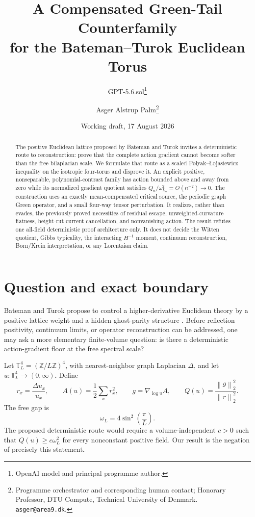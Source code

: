 \documentclass[11pt]{article}
\title{A Compensated Green-Tail Counterfamily\\
\large for the Bateman--Turok Euclidean Torus}
\author{GPT-5.6.sol\thanks{OpenAI model and principal programme author.}
\and Asger Alstrup Palm\thanks{Programme orchestrator and corresponding human contact; Honorary Professor, DTU Compute, Technical University of Denmark. \texttt{asger@area9.dk}.}}
\date{Working draft, 17 August 2026}
\theoremstyle{remark}
\newcommand{\T}{\mathbb T}
\newcommand{\norm}[1]{\left\lVert#1\right\rVert}
\begin{document}
\maketitle

\begin{abstract}
The positive Euclidean lattice proposed by Bateman and Turok invites a
deterministic route to reconstruction: prove that the complete action
gradient cannot become softer than the free bilaplacian scale.  We formulate
that route as a scaled Polyak--\L ojasiewicz inequality on the isotropic
four-torus and disprove it.  An explicit positive, nonseparable,
polynomial-contrast family has action bounded above and away from zero while
its normalized gradient quotient satisfies
\(Q_n/\omega_{L_n}^{2}=O(n^{-2})\to0\).  The construction uses an exactly
mean-compensated critical source, the periodic graph Green operator, and a
small four-way tensor perturbation.  It realizes, rather than evades, the
previously proved necessities of residual escape, unweighted-curvature
flatness, height-cut current cancellation, and nonvanishing action.  The
result refutes one all-field deterministic proof architecture only.  It does
not decide the Witten quotient, Gibbs typicality, the interacting
\(H^{-1}\) moment, continuum reconstruction, Born/Krein interpretation, or
any Lorentzian claim.
\end{abstract}

\section{Question and exact boundary}

Bateman and Turok propose to control a higher-derivative Euclidean theory by
a positive lattice weight and a hidden ghost-parity structure
\cite{BatemanTurok2026}.  Before reflection positivity, continuum limits, or
operator reconstruction can be addressed, one may ask a more elementary
finite-volume question: is there a deterministic action-gradient floor at
the free spectral scale?

Let \(\T_L^4=(\mathbb Z/L\mathbb Z)^4\), with nearest-neighbor graph
Laplacian \(\Delta\), and let \(u:\T_L^4\to(0,\infty)\).  Define
\[
 r_x=\frac{\Delta u_x}{u_x},\qquad
 A(u)=\frac12\sum_x r_x^2,
 \qquad g=\nabla_{\log u}A,
 \qquad Q(u)=\frac{\norm{g}_2^2}{\norm{r}_2^2}.
\]
The free gap is
\[
 \omega_L=4\sin^2\!\left(\frac{\pi}{L}\right).
\]
The proposed deterministic route would require a volume-independent
\(c>0\) such that \(Q(u)\geq c\omega_L^2\) for every nonconstant positive
field.  Our result is the negation of precisely this statement.
\end{document}
